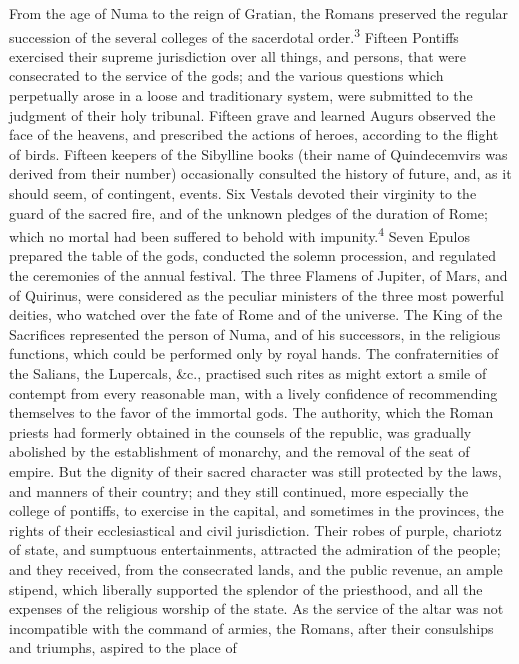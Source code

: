 From the age of Numa to the reign of Gratian, the Romans
preserved the regular succession of the several colleges of the
sacerdotal order.\textsuperscript{3} Fifteen Pontiffs exercised their supreme
jurisdiction over all things, and persons, that were consecrated
to the service of the gods; and the various questions which
perpetually arose in a loose and traditionary system, were
submitted to the judgment of their holy tribunal. Fifteen grave
and learned Augurs observed the face of the heavens, and
prescribed the actions of heroes, according to the flight of
birds. Fifteen keepers of the Sibylline books (their name of
Quindecemvirs was derived from their number) occasionally
consulted the history of future, and, as it should seem, of
contingent, events. Six Vestals devoted their virginity to the
guard of the sacred fire, and of the unknown pledges of the
duration of Rome; which no mortal had been suffered to behold
with impunity.\textsuperscript{4} Seven Epulos prepared the table of the gods,
conducted the solemn procession, and regulated the ceremonies of
the annual festival. The three Flamens of Jupiter, of Mars, and
of Quirinus, were considered as the peculiar ministers of the
three most powerful deities, who watched over the fate of Rome
and of the universe. The King of the Sacrifices represented the
person of Numa, and of his successors, in the religious
functions, which could be performed only by royal hands. The
confraternities of the Salians, the Lupercals, \&c., practised
such rites as might extort a smile of contempt from every
reasonable man, with a lively confidence of recommending
themselves to the favor of the immortal gods. The authority,
which the Roman priests had formerly obtained in the counsels of
the republic, was gradually abolished by the establishment of
monarchy, and the removal of the seat of empire. But the dignity
of their sacred character was still protected by the laws, and
manners of their country; and they still continued, more
especially the college of pontiffs, to exercise in the capital,
and sometimes in the provinces, the rights of their
ecclesiastical and civil jurisdiction. Their robes of purple,
chariotz of state, and sumptuous entertainments, attracted the
admiration of the people; and they received, from the consecrated
lands, and the public revenue, an ample stipend, which liberally
supported the splendor of the priesthood, and all the expenses of
the religious worship of the state. As the service of the altar
was not incompatible with the command of armies, the Romans,
after their consulships and triumphs, aspired to the place of

